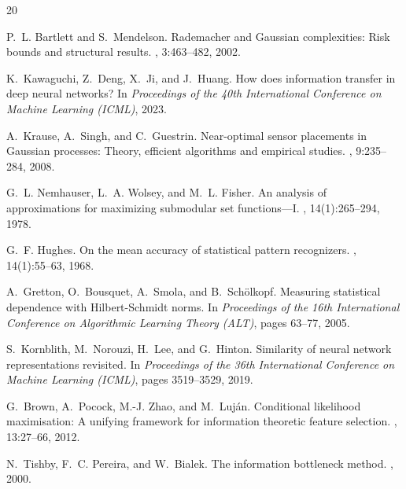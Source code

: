 \documentclass[UTF8,fontset=fandol]{ctexart}
\theoremstyle{remark}
\begin{document}
\begin{thebibliography}{20}

P.~L. Bartlett and S.~Mendelson.
\newblock Rademacher and Gaussian complexities: Risk bounds and structural results.
, 3:463--482, 2002.

K.~Kawaguchi, Z.~Deng, X.~Ji, and J.~Huang.
\newblock How does information transfer in deep neural networks?
\newblock In {\em Proceedings of the 40th International Conference on Machine Learning (ICML)}, 2023.

A.~Krause, A.~Singh, and C.~Guestrin.
\newblock Near-optimal sensor placements in {G}aussian processes: Theory, efficient algorithms and empirical studies.
, 9:235--284, 2008.

G.~L. Nemhauser, L.~A. Wolsey, and M.~L. Fisher.
\newblock An analysis of approximations for maximizing submodular set functions---{I}.
, 14(1):265--294, 1978.

G.~F. Hughes.
\newblock On the mean accuracy of statistical pattern recognizers.
, 14(1):55--63, 1968.

A.~Gretton, O.~Bousquet, A.~Smola, and B.~Sch{\"o}lkopf.
\newblock Measuring statistical dependence with {H}ilbert-{S}chmidt norms.
\newblock In {\em Proceedings of the 16th International Conference on Algorithmic Learning Theory (ALT)}, pages 63--77, 2005.

S.~Kornblith, M.~Norouzi, H.~Lee, and G.~Hinton.
\newblock Similarity of neural network representations revisited.
\newblock In {\em Proceedings of the 36th International Conference on Machine Learning (ICML)}, pages 3519--3529, 2019.

G.~Brown, A.~Pocock, M.-J. Zhao, and M.~Luj{\'a}n.
\newblock Conditional likelihood maximisation: A unifying framework for information theoretic feature selection.
, 13:27--66, 2012.

N.~Tishby, F.~C. Pereira, and W.~Bialek.
\newblock The information bottleneck method.
, 2000.


\end{thebibliography}
\end{document}
